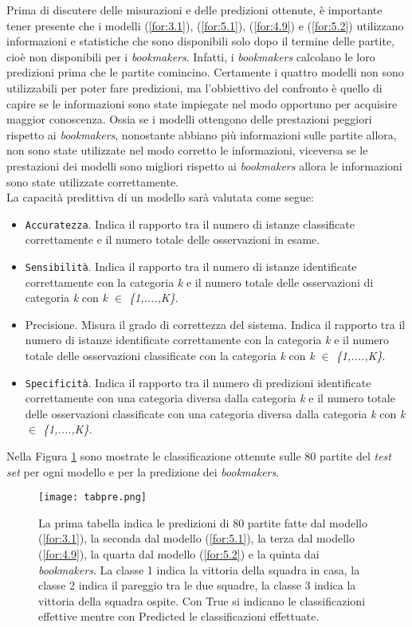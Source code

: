 Prima di discutere delle misurazioni e delle predizioni ottenute, è importante tener presente che i modelli (\ref{for:3.1}), (\ref{for:5.1}), (\ref{for:4.9}) e (\ref{for:5.2}) utilizzano informazioni e statistiche che sono disponibili solo dopo il termine delle partite, cioè non disponibili per i \emph{bookmakers}. Infatti, i \emph{bookmakers} calcolano le loro predizioni prima che le partite comincino. Certamente i quattro modelli non sono utilizzabili per poter fare predizioni, ma l'obbiettivo del confronto è quello di capire se le informazioni sono state impiegate nel modo opportuno per acquisire maggior conoscenza. Ossia se i modelli ottengono delle prestazioni peggiori rispetto ai \emph{bookmakers}, nonostante abbiano più informazioni sulle partite allora, non sono state utilizzate nel modo corretto le informazioni, viceversa se le prestazioni dei modelli sono migliori rispetto ai \emph{bookmakers} allora le informazioni sono state utilizzate correttamente. \\
La capacità predittiva di un modello sarà valutata come segue:
\begin{itemize}
	\item \texttt{Accuratezza}. Indica il rapporto tra il numero di istanze classificate correttamente e il numero totale delle osservazioni in esame.
	\item \texttt{Sensibilità}. Indica il rapporto tra il numero di istanze identificate correttamente con la categoria \emph{k} e il numero totale delle osservazioni di categoria \emph{k} con \emph{k $\in$ \{1,....,K\}}.
	\item \textsf{Precisione}. Misura il grado di correttezza del sistema. Indica il rapporto tra il numero di istanze identificate correttamente con la categoria \emph{k} e il numero totale delle osservazioni classificate con la categoria \emph{k} con \emph{k $\in$ \{1,....,K\}}.
	\item \texttt{Specificità}. Indica il rapporto tra il numero di predizioni identificate correttamente con una categoria diversa dalla categoria \emph{k} e il numero totale delle osservazioni classificate con una categoria diversa dalla categoria \emph{k} con \emph{k $\in$ \{1,....,K\}}.
\end{itemize}
Nella Figura \ref{fig:pre} sono mostrate le classificazione ottenute sulle 80 partite del \emph{test set} per ogni modello e per la predizione dei \emph{bookmakers}.
\begin{figure}[h]
	\begin{center}
		\texttt{[image: tabpre.png]}
		\caption{La prima tabella indica le predizioni di 80 partite fatte dal modello (\ref{for:3.1}), la seconda dal modello (\ref{for:5.1}), la terza dal modello (\ref{for:4.9}), la quarta dal modello (\ref{for:5.2}) e la quinta dai \emph{bookmakers}. La classe 1 indica la vittoria della squadra in casa, la classe 2 indica il pareggio tra le due squadre, la classe 3 indica la vittoria della squadra ospite. Con \textsf{True} si indicano le classificazioni effettive mentre con \textsf{Predicted} le classificazioni effettuate.}\label{fig:pre}
	\end{center}
\end{figure}
